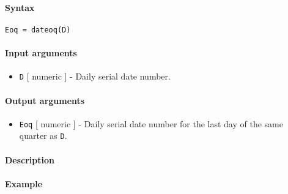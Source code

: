 


	\paragraph{Syntax}

\begin{verbatim}
Eoq = dateoq(D)
\end{verbatim}

\paragraph{Input arguments}

\begin{itemize}
\itemsep1pt\parskip0pt
\item
  \texttt{D} {[} numeric {]} - Daily serial date number.
\end{itemize}

\paragraph{Output arguments}

\begin{itemize}
\itemsep1pt\parskip0pt
\item
  \texttt{Eoq} {[} numeric {]} - Daily serial date number for the last
  day of the same quarter as \texttt{D}.
\end{itemize}

\paragraph{Description}

\paragraph{Example}


